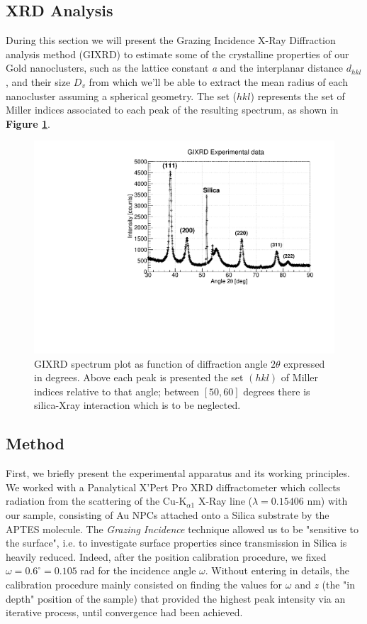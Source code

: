\documentclass[twocolumn]{article}
\begin{document}
\begin{multicols}{2}

\section{XRD Analysis}

During this section we will present the  Grazing Incidence X-Ray Diffraction analysis method (GIXRD) to estimate some of the crystalline properties of our Gold nanoclusters, such as the lattice constant {\it a} and the interplanar distance {\it $d_{hkl}$}, and their size $D_v$ from which we'll be able to extract the mean radius of each nanocluster assuming a spherical geometry. The set ($hkl$) represents the set of Miller indices associated to each peak of the resulting spectrum, as shown in {\bf Figure \ref{xrd_spectrum}}. 
\label{sec:XRD}

\begin{figure}[H]
\includegraphics[width=.48\textwidth]{image/data/XRD_plot.pdf}
\caption{GIXRD spectrum plot as function of diffraction angle $2\theta$ expressed in degrees. Above each peak is presented the set $(hkl)$ of Miller indices relative to that angle; between $[50,60]$ degrees there is silica-Xray interaction which is to be neglected.}
\label{xrd_spectrum}
\end{figure}


\subsection{Method}
First, we briefly present the experimental apparatus and its working principles.
We worked with a Panalytical X'Pert Pro XRD diffractometer which collects radiation from the scattering of the Cu-K$_{\alpha1}$ X-Ray line ($\lambda = 0.15406$ nm) with our sample, consisting of Au NPCs attached onto a Silica substrate by the APTES molecule. The {\it Grazing Incidence} technique allowed us to be "sensitive to the surface", i.e. to investigate surface properties since transmission in Silica is heavily reduced. Indeed, after the position calibration procedure, we fixed $\omega = 0.6^{\circ} = 0.105$ rad for the incidence angle $\omega$. 
Without entering in details, the calibration procedure mainly consisted on finding the values for $\omega$ and $z$ (the "in depth" position of the sample) that provided the highest peak intensity via an iterative process, until convergence had been achieved. %


\end{multicols}
\end{document}
